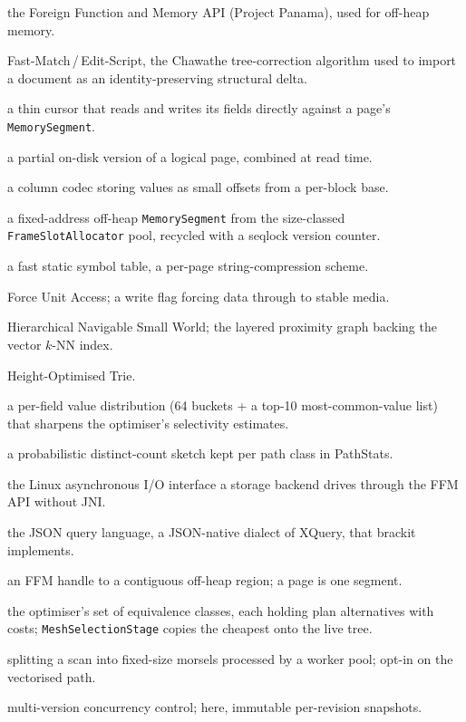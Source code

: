 \documentclass[11pt,a4paper,oneside]{report}
\theoremstyle{sirixthm}
\newcommand{\code}[1]{\texttt{#1}}
\begin{document}
\begin{description}[leftmargin=0pt,style=nextline,font=\bfseries\sffamily\color{slate}]
\item[FFM] the Foreign Function and Memory API (Project Panama), used for off-heap memory.
\item[FMES] Fast-Match\,/\,Edit-Script, the Chawathe tree-correction algorithm used to import a
  document as an identity-preserving structural delta.
\item[Flyweight node] a thin cursor that reads and writes its fields directly against a page's
  \code{MemorySegment}.
\item[Fragment] a partial on-disk version of a logical page, combined at read time.
\item[Frame of reference] a column codec storing values as small offsets from a per-block base.
\item[Frame slot] a fixed-address off-heap \code{MemorySegment} from the size-classed
  \code{FrameSlotAllocator} pool, recycled with a seqlock version counter.
\item[FSST] a fast static symbol table, a per-page string-compression scheme.
\item[FUA] Force Unit Access; a write flag forcing data through to stable media.
\item[HNSW] Hierarchical Navigable Small World; the layered proximity graph backing the vector $k$-NN
  index.
\item[HOT] Height-Optimised Trie.
\item[Histogram] a per-field value distribution (64 buckets {+} a top-10 most-common-value list) that
  sharpens the optimiser's selectivity estimates.
\item[HyperLogLog] a probabilistic distinct-count sketch kept per path class in PathStats.
\item[io\_uring] the Linux asynchronous I/O interface a storage backend drives through the FFM API
  without JNI.
\item[JSONiq] the JSON query language, a JSON-native dialect of XQuery, that brackit implements.
\item[MemorySegment] an FFM handle to a contiguous off-heap region; a page is one segment.
\item[Mesh] the optimiser's set of equivalence classes, each holding plan alternatives with costs;
  \code{MeshSelectionStage} copies the cheapest onto the live tree.
\item[Morsel-driven parallelism] splitting a scan into fixed-size morsels processed by a worker pool;
  opt-in on the vectorised path.
\item[MVCC] multi-version concurrency control; here, immutable per-revision snapshots.

\end{description}
\end{document}
